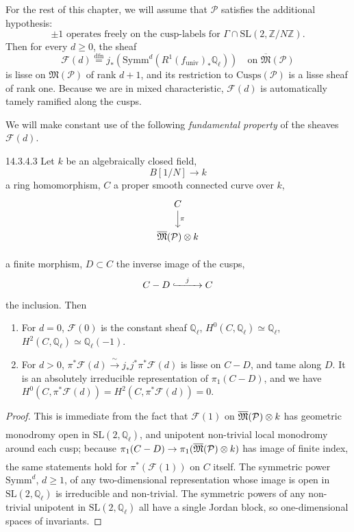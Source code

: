 \kmitem\label{item:14.3.4}
For the rest of this chapter, we will assume that $\mathcal{P}$ satisfies the additional hypothesis:
\begin{equation}\label{eq:14.3.4.1}
\pm 1 \text{ operates freely on the cusp-labels for } \Gamma \cap \mathrm{SL}(2, \mathbb{Z}/N\mathbb{Z}) .
\end{equation}
Then for every $d \ge 0$, the sheaf
\begin{equation}\label{eq:14.3.4.2}
\mathcal{F}(d) \overset{\mathrm{dfn}}{=} j_*(\mathrm{Symm}^d(R^1(f_{\mathrm{univ}})_* \mathbb{Q}_\ell)) \quad\text{on } \overline{\mathfrak{M}}(\mathcal{P})
\end{equation}
is lisse on $\mathfrak{M}(\mathcal{P})$ of rank $d+1$, and its restriction to $\mathrm{Cusps}(\mathcal{P})$ is a lisse sheaf of rank one. Because we are in mixed characteristic, $\mathcal{F}(d)$ is automatically tamely ramified along the cusps.

We will make constant use of the following \emph{fundamental property} of the sheaves $\mathcal{F}(d)$.

\begin{customprop}{14.3.4.3}\label{prop:14.3.4.3}
Let $k$ be an algebraically closed field,
\[
B[1/N] \to k
\]
a ring homomorphism, $C$ a proper smooth connected curve over $k$,
\[
\begin{tikzcd}[row sep=1.8em]
C \arrow[d, "\pi"] \\
\overline{\mathfrak{M}}(\mathcal{P}) \tens{} k
\end{tikzcd}
\]
a finite morphism, $D \subset C$ the inverse image of the cusps,
\[
C - D \mathrel{\lhook\joinrel\xrightarrow{\quad j\quad}} C
\]
the inclusion. Then
\begin{enumerate}[label=(\arabic*)]
\item For $d = 0$, $\mathcal{F}(0)$ is the constant sheaf $\mathbb{Q}_\ell$, $H^0(C, \mathbb{Q}_\ell) \simeq \mathbb{Q}_\ell$, $H^2(C, \mathbb{Q}_\ell) \simeq \mathbb{Q}_\ell(-1)$.
\item For $d > 0$, $\pi^*\mathcal{F}(d) \xrightarrow{\ \sim\ } j_* j^* \pi^*\mathcal{F}(d)$ is lisse on $C - D$, and tame along $D$. It is an absolutely irreducible representation of $\pi_1(C - D)$, and we have $H^0(C, \pi^*\mathcal{F}(d)) = H^2(C, \pi^*\mathcal{F}(d)) = 0$.
\end{enumerate}
\end{customprop}

\begin{proof}
This is immediate from the fact that $\mathcal{F}(1)$ on $\overline{\mathfrak{M}}(\mathcal{P}) \underset{}{\otimes} k$ has geometric monodromy open in $\mathrm{SL}(2, \mathbb{Q}_\ell)$, and unipotent non-trivial local monodromy around each cusp; because $\pi_1(C - D) \to \pi_1(\overline{\mathfrak{M}}(\mathcal{P}) \underset{}{\otimes} k)$ has image of finite index, the same statements hold for $\pi^*(\mathcal{F}(1))$ on $C$ itself. The symmetric power $\mathrm{Symm}^d$, $d \ge 1$, of any two-dimensional representation whose image is open in $\mathrm{SL}(2, \mathbb{Q}_\ell)$ is irreducible and non-trivial. The symmetric powers of any non-trivial unipotent in $\mathrm{SL}(2, \mathbb{Q}_\ell)$ all have a single Jordan block, so one-dimensional spaces of invariants.
\end{proof}

